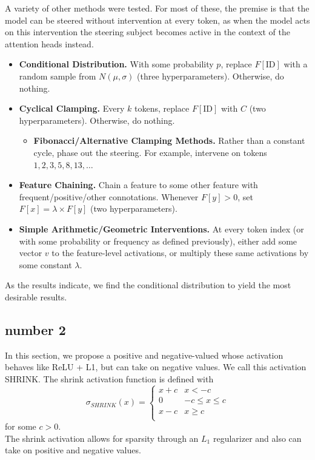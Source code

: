 \documentclass{article}
\begin{document}
A variety of other methods were tested. For most of these, the premise is that the model can be steered without intervention at every token, as when the model acts on this intervention the steering subject becomes active in the context of the attention heads instead. 
\begin{itemize}
    \item \textbf{Conditional Distribution.} With some probability $p$, replace $F[\text{ID}]$ with a random sample from $N(\mu, \sigma)$ (three hyperparameters). Otherwise, do nothing.
    \item \textbf{Cyclical Clamping.} Every $k$ tokens, replace $F[\text{ID}]$ with $C$ (two hyperparameters). Otherwise, do nothing.
    \begin{itemize}
        \item \textbf{Fibonacci/Alternative Clamping Methods.} Rather than a constant cycle, phase out the steering. For example, intervene on tokens $1,2,3,5,8,13,\dots$
    \end{itemize}
    \item \textbf{Feature Chaining.} Chain a feature to some other feature with frequent/positive/other connotations. Whenever $F[y]>0$, set $F[x]=\lambda \times F[y]$ (two hyperparameters).
    \item \textbf{Simple Arithmetic/Geometric Interventions.} At every token index (or with some probability or frequency as defined previously), either add some vector $v$ to the feature-level activations, or multiply these same activations by some constant $\lambda$. 
\end{itemize}

As the results indicate, we find the conditional distribution to yield the most desirable results.

\subsection{number 2}
In this section, we propose a positive and negative-valued whose activation behaves like ReLU + L1, but can take on negative values. We call this activation SHRINK. The shrink activation function is defined with
    $$\sigma_{SHRINK}(x) = \begin{cases}
        x+c & x < -c\\
        0 & -c \leq x \leq c\\
        x - c & x\geq c\\
    \end{cases}$$
    for some $c > 0$.\\
The shrink activation allows for sparsity through an $L_1$ regularizer and also can take on positive and negative values.
\end{document}
